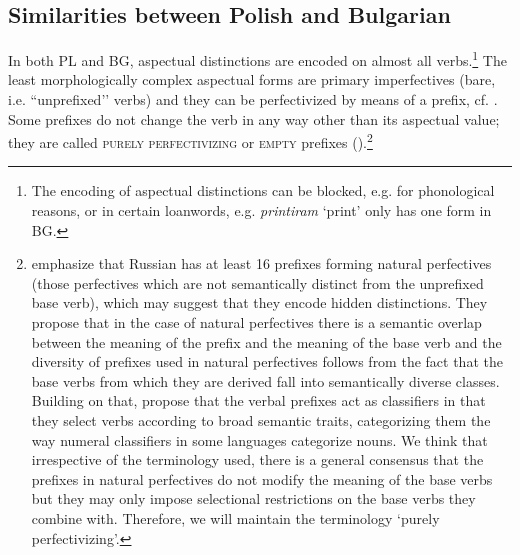 \documentclass[output=paper,colorlinks,citecolor=brown]{langscibook}
\begin{document}
\subsection{Similarities between Polish and Bulgarian}\label{subsection:background-SI:similarities}
In both PL and BG, aspectual distinctions are encoded on almost all verbs.\footnote{The encoding of aspectual distinctions can be blocked, e.g. for phonological reasons, %
or in certain loanwords, e.g. \textit{printiram} `print' only has one form in BG.} The least morphologically complex aspectual forms are primary imperfectives (bare, i.e. ``unprefixed’’ verbs) and they can be perfectivized by means of a prefix, cf. . Some prefixes do not change the verb in any way other than its aspectual value; they are called \textsc{purely perfectivizing} or \textsc{empty} prefixes    (\citealt{boguslawski1963,svenonius2004b,kli+:svenonius2004a,mlynarczyk2004,willim2006,kli+:ramchand2008a}).\footnote{\citet{janda2010} emphasize that Russian has at least 16 prefixes forming natural perfectives (those perfectives which are not semantically distinct from the unprefixed base verb), which may suggest that they encode hidden distinctions.
They propose that in the case of natural perfectives there is a semantic overlap between the meaning of the prefix and the meaning of the base verb and the diversity of prefixes used in natural perfectives follows from the fact that the base verbs from which they are derived fall into semantically diverse classes. Building on that, \citet{janda2013} propose that the verbal prefixes act as classifiers in that they select verbs according to broad semantic traits, categorizing them the way numeral classifiers in some languages categorize nouns. We think that irrespective of the terminology used, there is a general consensus that the prefixes in natural perfectives do not modify the meaning of the base verbs but they may only impose selectional restrictions on the base verbs they combine with. Therefore, we will maintain the terminology `purely perfectivizing'.}

\end{document}
